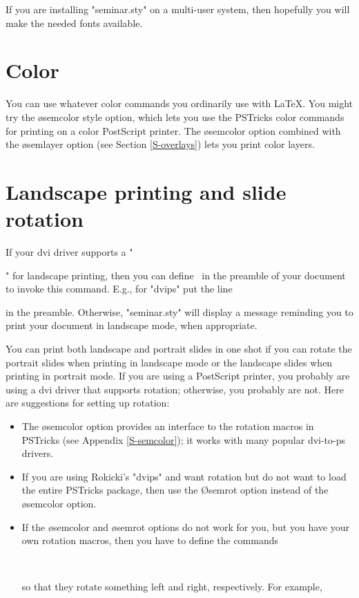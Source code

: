 \begin{slide}
If you are installing "seminar.sty" on a multi-user system, then hopefully you
will make the needed fonts available.

\section{Color}

You can use whatever color commands you ordinarily use with \LaTeX. You might
try the \o{semcolor} style option, which lets you use the PSTricks color
commands for printing on a color PostScript printer. The \o{semcolor} option
combined with the \o{semlayer} option (see Section \ref{S-overlays}) lets you
print color layers.

\section{Landscape printing and slide rotation\label{S-landscape}}

If your dvi driver supports a "\special" for landscape printing, then you can
define \N\printlandscape\ in the preamble of your document to invoke this
command. E.g., for "dvips" put the line
\begin{LVerbatim}
  \renewcommand{\printlandscape}{\special{landscape}}
\end{LVerbatim}
in the preamble. Otherwise, "seminar.sty" will display a message reminding you
to print your document in landscape mode, when appropriate.

You can print both landscape and portrait slides in one shot if you can rotate
the portrait slides when printing in landscape mode or the landscape slides
when printing in portrait mode. If you are using a PostScript printer, you
probably are using a dvi driver that supports rotation; otherwise, you
probably are not. Here are suggestions for setting up rotation:
\begin{itemize}
\item The \o{semcolor} option provides an interface to the rotation macros in
PSTricks (see Appendix \ref{S-semcolor}); it works with many popular dvi-to-ps
drivers.

\item If you are using Rokicki's "dvips" and want rotation but do not want to
load the entire PSTricks package, then use the \O{semrot} option instead of
the \o{semcolor} option.

\item If the \o{semcolor} and \o{semrot} options do not work for you, but you
have your own rotation macros, then you have to define the commands
\begin{MD}
  \leftsliderotation\\
  \rightsliderotation
\end{MD}
so that they rotate something left and right, respectively. For example,
\begin{LVerbatim}
  \renewcommand{\leftsliderotation}[1]{\rotateleft{#1}}
\end{LVerbatim}
\end{itemize}


\end{slide}
